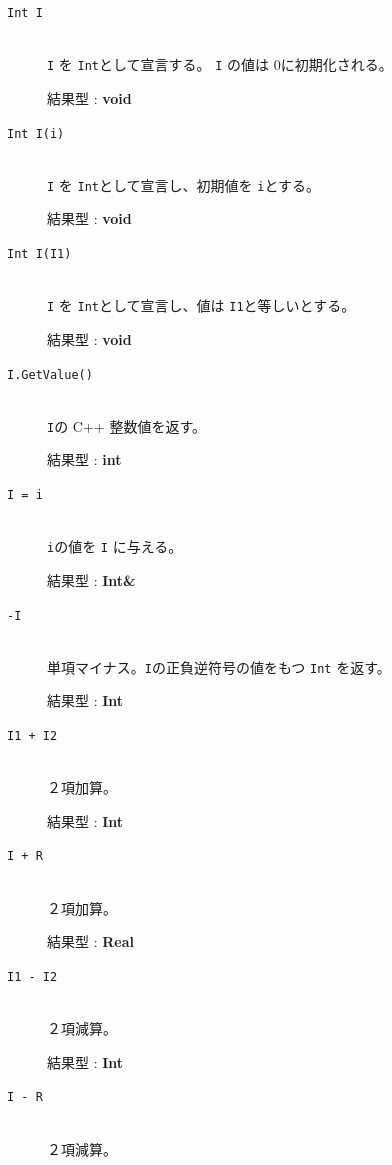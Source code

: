 \documentclass[\pformat,12pt]{jarticle}
\begin{document}
\vspace{0.5cm}

\begin{description}
\item[{\tt Int I}] \mbox{}\\
      {\tt I} を {\tt Int}として宣言する。
{\tt I} の値は 0に初期化される。

     結果型 : {\bf void}
\item[{\tt Int I(i)}] \mbox{}\\
      {\tt I} を {\tt Int}として宣言し、初期値を {\tt i}とする。

     結果型 : {\bf void}

\item[{\tt Int I(I1)}] \mbox{}\\
      {\tt I} を {\tt Int}として宣言し、値は  {\tt I1}と等しいとする。

     結果型 : {\bf void}

\item[{\tt I.GetValue()}] \mbox{}\\
     {\tt I}の C++ 整数値を返す。

     結果型 : {\bf int}

\item[{\tt I = i}] \mbox{}\\
      {\tt i}の値を {\tt I} に与える。

     結果型 : {\bf Int\&}

\item[{\tt -I}] \mbox{}\\
     単項マイナス。{\tt I}の正負逆符号の値をもつ {\tt Int} を返す。

     結果型 : {\bf Int}

\item[{\tt I1 + I2}] \mbox{}\\
     ２項加算。 

     結果型 : {\bf Int}

\item[{\tt I + R}] \mbox{}\\
     ２項加算。 

     結果型 : {\bf Real}

\item[{\tt I1 - I2}] \mbox{}\\
     ２項減算。

     結果型 : {\bf Int}

\item[{\tt I - R}] \mbox{}\\
     ２項減算。 


\end{description}
\end{document}
